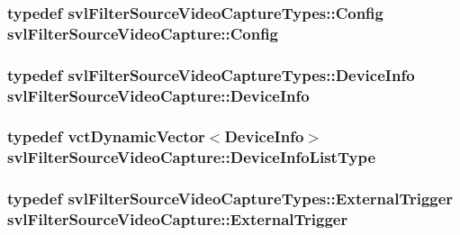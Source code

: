 \subsubsection[{Config}]{\setlength{\rightskip}{0pt plus 5cm}typedef {\bf svl\+Filter\+Source\+Video\+Capture\+Types\+::\+Config} {\bf svl\+Filter\+Source\+Video\+Capture\+::\+Config}}\label{classsvl_filter_source_video_capture_ac541a625ce316b5320170cef3ca02277}
\hypertarget{classsvl_filter_source_video_capture_ad656487fb2deec890dc39764152b8f8b}{}
\subsubsection[{Device\+Info}]{\setlength{\rightskip}{0pt plus 5cm}typedef {\bf svl\+Filter\+Source\+Video\+Capture\+Types\+::\+Device\+Info} {\bf svl\+Filter\+Source\+Video\+Capture\+::\+Device\+Info}}\label{classsvl_filter_source_video_capture_ad656487fb2deec890dc39764152b8f8b}
\hypertarget{classsvl_filter_source_video_capture_a52d28d8296c6b85055022a72c69334e4}{}
\subsubsection[{Device\+Info\+List\+Type}]{\setlength{\rightskip}{0pt plus 5cm}typedef {\bf vct\+Dynamic\+Vector}$<${\bf Device\+Info}$>$ {\bf svl\+Filter\+Source\+Video\+Capture\+::\+Device\+Info\+List\+Type}}\label{classsvl_filter_source_video_capture_a52d28d8296c6b85055022a72c69334e4}
\hypertarget{classsvl_filter_source_video_capture_a609a8eb75ea23b7b35068207cc3c3144}{}
\subsubsection[{External\+Trigger}]{\setlength{\rightskip}{0pt plus 5cm}typedef {\bf svl\+Filter\+Source\+Video\+Capture\+Types\+::\+External\+Trigger} {\bf svl\+Filter\+Source\+Video\+Capture\+::\+External\+Trigger}}\label{classsvl_filter_source_video_capture_a609a8eb75ea23b7b35068207cc3c3144}
\hypertarget{classsvl_filter_source_video_capture_af6d31bdf8807755322cd7e5ef1f0d8d9}{}
